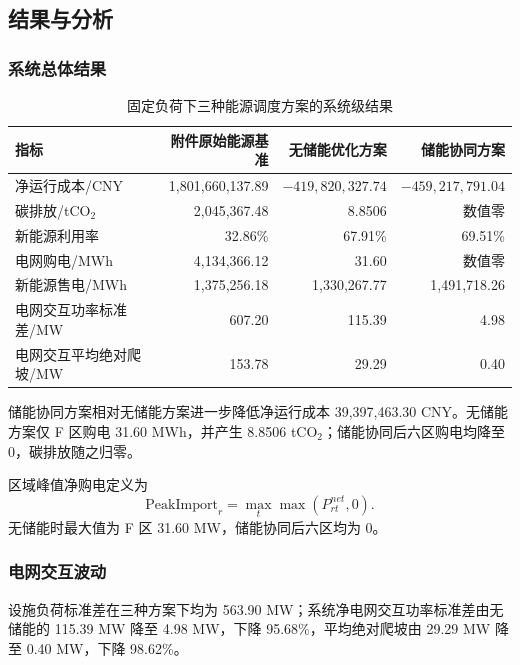 

\subsection{结果与分析}

\subsubsection{系统总体结果}

\begingroup
{}
\begin{table}[!htbp]
\centering
\caption{固定负荷下三种能源调度方案的系统级结果}
\label{tab:q3-system-results}
\begin{tabular}{lrrr}
\toprule
\rowcolor{CumcmLightBlue}
指标 & 附件原始能源基准 & 无储能优化方案 & 储能协同方案 \\
\midrule
净运行成本/CNY & 1,801,660,137.89 & $-419,820,327.74$ & $-459,217,791.04$ \\
碳排放/tCO$_2$ & 2,045,367.48 & 8.8506 & 数值零 \\
新能源利用率 & 32.86\% & 67.91\% & 69.51\% \\
电网购电/MWh & 4,134,366.12 & 31.60 & 数值零 \\
新能源售电/MWh & 1,375,256.18 & 1,330,267.77 & 1,491,718.26 \\
电网交互功率标准差/MW & 607.20 & 115.39 & 4.98 \\
电网交互平均绝对爬坡/MW & 153.78 & 29.29 & 0.40 \\
\bottomrule
\end{tabular}
\end{table}
\endgroup

储能协同方案相对无储能方案进一步降低净运行成本 39,397,463.30 CNY。无储能方案仅 F 区购电 31.60 MWh，并产生 8.8506 tCO$_2$；储能协同后六区购电均降至 0，碳排放随之归零。

区域峰值净购电定义为
\begin{equation}
\mathrm{PeakImport}_r=\max_t\max(P^{net}_{rt},0).
\end{equation}
无储能时最大值为 F 区 31.60 MW，储能协同后六区均为 0。

\subsubsection{电网交互波动}

设施负荷标准差在三种方案下均为 563.90 MW；系统净电网交互功率标准差由无储能的 115.39 MW 降至 4.98 MW，下降 95.68\%，平均绝对爬坡由 29.29 MW 降至 0.40 MW，下降 98.62\%。

